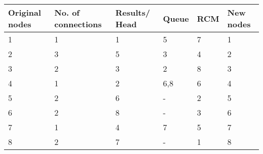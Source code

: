 
\begin{center}
    \begin{tabular}{ P{2cm} | P{2cm} P{2cm} P{2cm} P{2cm} P{2cm} }
      \small Original nodes &
      \small No. of connections &
      \small Results/ Head &
      \small \phantom{\rule{1.9cm}{1pt}} Queue &
      \small \phantom{\rule{1.9cm}{1pt}} RCM &
      \small \phantom{\rule{1.9cm}{1pt}} New nodes\\
      \hline\normalsize
      1             & 1              & 1          & 5    &7    &1        \\
      2             & 3              & 5          & 3    &4    &2        \\
      3             & 2              & 3          & 2    &8    &3        \\
      4             & 1              & 2          & 6,8  &6    &4        \\
      5             & 2              & 6          & -    &2    &5        \\
      6             & 2              & 8          & -    &3    &6        \\
      7             & 1              & 4          & 7    &5    &7        \\
      8             & 2              & 7          & -    &1    &8        \\
    \end{tabular}
\end{center}
  
